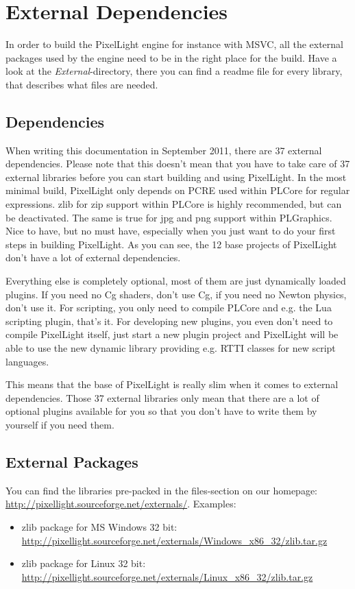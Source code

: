 \chapter{External Dependencies}
\label{Chapter:ExternalDependencies}
In order to build the PixelLight engine for instance with MSVC, all the external packages used by the engine need to be in the right place for the build. Have a look at the \emph{External}-directory, there you can find a readme file for every library, that describes what files are needed.




\section{Dependencies}
When writing this documentation in September 2011, there are 37 external dependencies. Please note that this doesn't mean that you have to take care of 37 external libraries before you can start building and using PixelLight. In the most minimal build, PixelLight only depends on PCRE used within PLCore for regular expressions. zlib for zip support within PLCore is highly recommended, but can be deactivated. The same is true for jpg and png support within PLGraphics. Nice to have, but no must have, especially when you just want to do your first steps in building PixelLight. As you can see, the 12 base projects of PixelLight don't have a lot of external dependencies.

Everything else is completely optional, most of them are just dynamically loaded plugins. If you need no Cg shaders, don't use Cg, if you need no Newton physics, don't use it. For scripting, you only need to compile PLCore and e.g. the Lua scripting plugin, that's it. For developing new plugins, you even don't need to compile PixelLight itself, just start a new plugin project and PixelLight will be able to use the new dynamic library providing e.g. RTTI classes for new script languages.

This means that the base of PixelLight is really slim when it comes to external dependencies. Those 37 external libraries only mean that there are a lot of optional plugins available for you so that you don't have to write them by yourself if you need them.




\section{External Packages}
You can find the libraries pre-packed in the files-section on our homepage: \url{http://pixellight.sourceforge.net/externals/}. Examples:
\begin{itemize}
\item{zlib package for MS Windows 32 bit: \url{http://pixellight.sourceforge.net/externals/Windows_x86_32/zlib.tar.gz}}
\item{zlib package for Linux 32 bit: \url{http://pixellight.sourceforge.net/externals/Linux_x86_32/zlib.tar.gz}}
\end{itemize}

